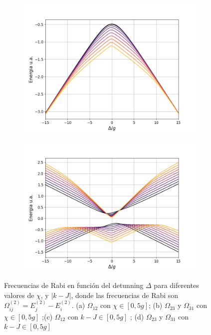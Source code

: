\begin{figure}
\begin{subfigure}{0.49\textwidth}
        \includegraphics[width=\textwidth]{figuras/ch4/omega12 2d k.png}
        \caption{}
        \label{fig4:rabi 1 k}
    \end{subfigure}
    \hfill
    \begin{subfigure}{0.49\textwidth}
        \includegraphics[width=\textwidth]{figuras/ch4/omega23 2d k.png}
        \caption{}
        \label{fig4:rabi 2 k}
    \end{subfigure}
    \caption{Frecuencias de Rabi en función del detunning $\Delta$ para diferentes valores de $\chi$, y $|k-J|$, donde las frecuencias de Rabi son $\Omega^{(2)}_{ij}=E^{(2)}_{j}-E^{(2)}_{i}$. (a) $\Omega_{12}$ con $\chi\in [0,5g]$; (b) $\Omega_{23}$ y $\Omega_{31}$ con $\chi\in [0,5g]$ ;(c) $\Omega_{12}$ con $k-J\in [0,5g]$ ; (d) $\Omega_{23}$ y $\Omega_{31}$ con $k-J\in [0,5g]$}
    \label{fig4:frecuencias de rabi}
\end{figure}


